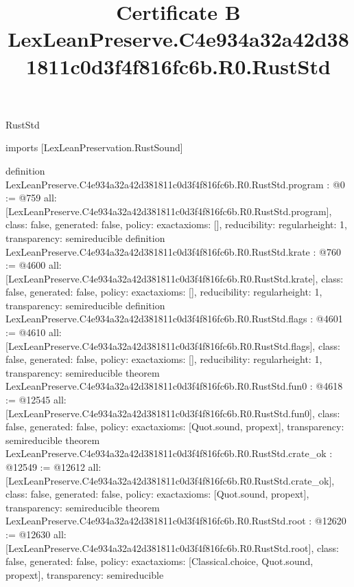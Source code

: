 \begin{lexlean}{RustStd}
\title{Certificate B LexLeanPreserve.C4e934a32a42d381811c0d3f4f816fc6b.R0.RustStd}
\begin{coremodule}
imports [LexLeanPreservation.RustSound]

definition LexLeanPreserve.C4e934a32a42d381811c0d3f4f816fc6b.R0.RustStd.program : @0 := @759 {
  all: [LexLeanPreserve.C4e934a32a42d381811c0d3f4f816fc6b.R0.RustStd.program],
  class: false,
  generated: false,
  policy: exact{axioms: []},
  reducibility: regular{height: 1},
  transparency: semireducible
}
definition LexLeanPreserve.C4e934a32a42d381811c0d3f4f816fc6b.R0.RustStd.krate : @760 := @4600 {
  all: [LexLeanPreserve.C4e934a32a42d381811c0d3f4f816fc6b.R0.RustStd.krate],
  class: false,
  generated: false,
  policy: exact{axioms: []},
  reducibility: regular{height: 1},
  transparency: semireducible
}
definition LexLeanPreserve.C4e934a32a42d381811c0d3f4f816fc6b.R0.RustStd.flags : @4601 := @4610 {
  all: [LexLeanPreserve.C4e934a32a42d381811c0d3f4f816fc6b.R0.RustStd.flags],
  class: false,
  generated: false,
  policy: exact{axioms: []},
  reducibility: regular{height: 1},
  transparency: semireducible
}
theorem LexLeanPreserve.C4e934a32a42d381811c0d3f4f816fc6b.R0.RustStd.fun0 : @4618 := @12545 {
  all: [LexLeanPreserve.C4e934a32a42d381811c0d3f4f816fc6b.R0.RustStd.fun0],
  class: false,
  generated: false,
  policy: exact{axioms: [Quot.sound, propext]},
  transparency: semireducible
}
theorem LexLeanPreserve.C4e934a32a42d381811c0d3f4f816fc6b.R0.RustStd.crate_ok : @12549 := @12612 {
  all: [LexLeanPreserve.C4e934a32a42d381811c0d3f4f816fc6b.R0.RustStd.crate_ok],
  class: false,
  generated: false,
  policy: exact{axioms: [Quot.sound, propext]},
  transparency: semireducible
}
theorem LexLeanPreserve.C4e934a32a42d381811c0d3f4f816fc6b.R0.RustStd.root : @12620 := @12630 {
  all: [LexLeanPreserve.C4e934a32a42d381811c0d3f4f816fc6b.R0.RustStd.root],
  class: false,
  generated: false,
  policy: exact{axioms: [Classical.choice, Quot.sound, propext]},
  transparency: semireducible
}


\end{coremodule}
\end{lexlean}
